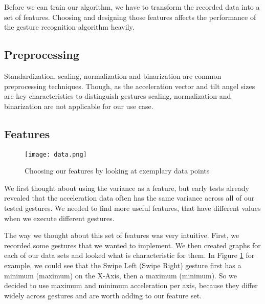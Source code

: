 Before we can train our algorithm, we  have to transform the recorded data into a set  of  features.
Choosing  and  designing  those  features  affects  the  performance  of  the gesture recognition algorithm heavily.

\subsection{Preprocessing}
\label{ch:DataCollection:sec:FeatureDesign:sub:Preprocessing}

Standardization,     scaling,     normalization     and     binarization     are     common preprocessing techniques.
Though, as the acceleration vector and tilt angel sizes are key characteristics  to  distinguish  gestures  scaling,  normalization  and  binarization  are  not applicable for our use case. 

\subsection{Features}
\label{ch:DataCollection:sec:FeatureDesign:sub:Features}

\begin{figure}
\begin{center}
  \texttt{[image: data.png]}
\caption{Choosing our features by looking at exemplary data points}\label{fig:datamining}
\end{center}
\end{figure} 
\newpage

We  first  thought  about  using  the  variance  as  a  feature,  but  early  tests  already revealed  that  the  acceleration  data  often  has  the same variance across all of our tested gestures. We needed to find more useful features, that have different values when we execute different gestures.

The way we thought about this set of features was very intuitive. First, we recorded some gestures that we wanted to implement.
We then created graphs for each of our data sets and looked what is characteristic for them.
In Figure \ref{fig:datamining} for example, we could see that the Swipe Left (Swipe Right) gesture first has a minimum (maximum) on the X-Axis, then a maximum (minimum).
So we decided to use maximum  and  minimum  acceleration  per  axis, because they  differ  widely  across gestures  and  are  worth  adding  to  our  feature  set.

